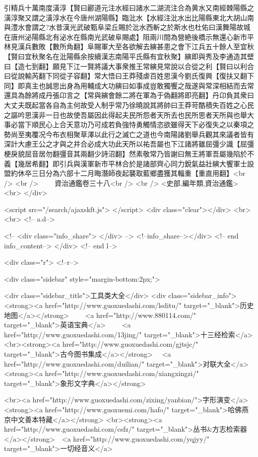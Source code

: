 引精兵十萬南度潢淳【賢曰酈道元注水經曰諸水二湖流注合為黄水又南經棘陽縣之潢淳聚又謂之潢淳水在今唐州湖陽縣】臨沘水【水經注沘水出比陽縣東北大胡山南與澧水會謂之?水昔漢光武破甄阜梁丘賜於沘水西斬之於斯水也杜佑曰漢舞陽故城在唐州泌陽縣北有泌水在縣南光武破阜賜處】阻兩川間為營絶後橋示無還心新市平林見漢兵數敗【數所角翻】阜賜軍大至各欲解去縯甚患之會下江兵五十餘人至宜秋【賢曰宜秋聚名在沘陽縣余按續漢志南陽平氏縣有宜秋聚】縯即與秀及李通造其壁曰【造七到翻】願見下江一賢將議大事衆推王常縯見常說以合從之利【賢曰以利合曰從說輸芮翻下同從子容翻】常大悟曰王莽殘虐百姓思漢今劉氏復興【復扶又翻下同】即真主也誠思出身為用輔成大功縯曰如事成豈敢獨饗之哉遂與常深相結而去常還具為餘將成丹張卬言之【常與縯會餘二將在軍為于偽翻將即亮翻】丹卬負其衆曰大丈夫既起當各自為主何故受人制乎常乃徐曉說其將帥曰王莽苛酷積失百姓之心民之謳吟思漢非一日也故使吾屬因此得起夫民所怨者天所去也民所思者天所與也舉大事必當下順民心上合天意功乃可成若負強恃勇觸情恣欲雖得天下必復失之以秦項之勢尚至夷覆况今布衣相聚草澤以此行之滅亡之道也今南陽諸劉舉兵觀其來議者皆有深計大慮王公之才與之并合必成大功此天所以祐吾屬也下江諸將雖屈彊少識【屈彊梗戾貌屈音居勿翻彊音其兩翻少詩沼翻】然素敬常乃皆謝曰無王將軍吾屬幾陷於不義【幾居希翻】即引兵與漢軍新市平林合於是諸部齊心同力銳氣益壯縯大饗軍士設盟約休卒三日分為六部十二月晦潛師夜起襲取藍鄉盡獲其輜重【重直用翻】<br />
<br />
　　資治通鑑卷三十八<br />
<br />
<史部,編年類,資治通鑑>  <br>
   </div> 

<script src="/search/ajaxskft.js"> </script>
 <div class="clear"></div>
<br>
<br>
 <!-- a.d-->

 <!--
<div class="info_share">
</div> 
-->
 <!--info_share--></div>   <!-- end info_content-->
  </div> <!-- end l-->

<div class="r">   <!--r-->



<div class="sidebar"  style="margin-bottom:2px;">

 
<div class="sidebar_title">工具类大全</div>
<div class="sidebar_info">
<strong><a href="http://www.guoxuedashi.com/lsditu/" target="_blank">历史地图</a></strong>　　
<a href="http://www.880114.com/" target="_blank">英语宝典</a>　　
<a href="http://www.guoxuedashi.com/13jing/" target="_blank">十三经检索</a>　
<br><strong><a href="http://www.guoxuedashi.com/gjtsjc/" target="_blank">古今图书集成</a></strong>　
<a href="http://www.guoxuedashi.com/duilian/" target="_blank">对联大全</a>　<strong><a href="http://www.guoxuedashi.com/xiangxingzi/" target="_blank">象形文字典</a></strong>　

<br><a href="http://www.guoxuedashi.com/zixing/yanbian/">字形演变</a>　　<strong><a href="http://www.guoxuemi.com/hafo/" target="_blank">哈佛燕京中文善本特藏</a></strong>
<br><strong><a href="http://www.guoxuedashi.com/csfz/" target="_blank">丛书&方志检索器</a></strong>　<a href="http://www.guoxuedashi.com/yqjyy/" target="_blank">一切经音义</a>　　

